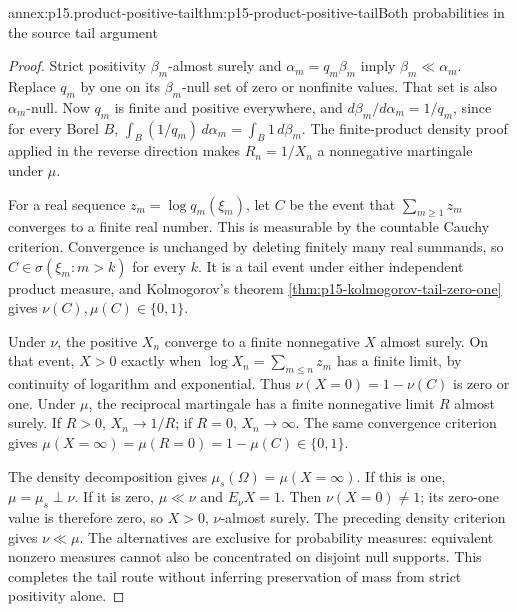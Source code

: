 \begin{annexitem}{annex:p15.product-positive-tail}{thm:p15-product-positive-tail}{Both probabilities in the source tail argument}
\begin{proof}
Strict positivity \(\beta_m\)-almost surely and
\(\alpha_m=q_m\beta_m\) imply \(\beta_m\ll\alpha_m\).
Replace \(q_m\) by one on its \(\beta_m\)-null set of zero or nonfinite
values. That set is also \(\alpha_m\)-null.
Now \(q_m\) is finite and positive everywhere, and
\(d\beta_m/d\alpha_m=1/q_m\), since for every Borel \(B\),
\(\int_B(1/q_m)\,d\alpha_m=\int_B1\,d\beta_m\).
The finite-product density proof applied in the reverse direction
makes \(R_n=1/X_n\) a nonnegative martingale under \(\mu\).

For a real sequence \(z_m=\log q_m(\xi_m)\), let \(C\) be the event
that \(\sum_{m\geq1}z_m\) converges to a finite real number.
This is measurable by the countable Cauchy criterion.
Convergence is unchanged by deleting finitely many real summands,
so \(C\in\sigma(\xi_m:m>k)\) for every \(k\).
It is a tail event under either independent product measure, and
Kolmogorov's theorem \cref{thm:p15-kolmogorov-tail-zero-one} gives
\(\nu(C),\mu(C)\in\{0,1\}\).

Under \(\nu\), the positive \(X_n\) converge to a finite nonnegative
\(X\) almost surely. On that event, \(X>0\) exactly when
\(\log X_n=\sum_{m\leq n}z_m\) has a finite limit, by continuity
of logarithm and exponential. Thus \(\nu(X=0)=1-\nu(C)\)
is zero or one.
Under \(\mu\), the reciprocal martingale has a finite nonnegative
limit \(R\) almost surely. If \(R>0\), \(X_n\to1/R\);
if \(R=0\), \(X_n\to\infty\).
The same convergence criterion gives
\(\mu(X=\infty)=\mu(R=0)=1-\mu(C)\in\{0,1\}\).

The density decomposition gives
\(\mu_s(\Omega)=\mu(X=\infty)\).
If this is one, \(\mu=\mu_s\perp\nu\).
If it is zero, \(\mu\ll\nu\) and \(E_\nu X=1\).
Then \(\nu(X=0)\ne1\); its zero-one value is therefore zero,
so \(X>0\), \(\nu\)-almost surely. The preceding density criterion
gives \(\nu\ll\mu\).
The alternatives are exclusive for probability measures: equivalent
nonzero measures cannot also be concentrated on disjoint null supports.
This completes the tail route without inferring preservation of mass
from strict positivity alone.
\end{proof}
\end{annexitem}

